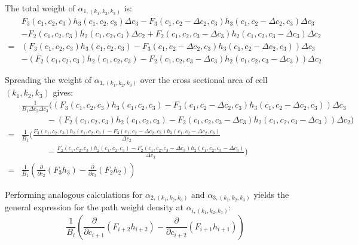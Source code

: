 \documentclass{book}
\begin{document}
The total weight of \(\alpha_{1, (k_1, k_2, k_3)}\) is:
\begin{align*}
& F_3(c_1,c_2,c_3)h_3(c_1,c_2,c_3)\Delta c_3 
- F_3(c_1,c_2 - \Delta c_2,c_3)h_3(c_1,c_2 - \Delta c_2,c_3)\Delta c_3 \\
& - F_2(c_1,c_2,c_3)h_2(c_1,c_2,c_3)\Delta c_2
+ F_2(c_1,c_2,c_3 - \Delta c_3)h_2(c_1,c_2,c_3 - \Delta c_3)\Delta c_2 \\ 
= & (F_3(c_1,c_2,c_3)h_3(c_1,c_2,c_3) 
- F_3(c_1,c_2 - \Delta c_2,c_3)h_3(c_1,c_2 - \Delta c_2,c_3))\Delta c_3 \\
& - (F_2(c_1,c_2,c_3)h_2(c_1,c_2,c_3)
- F_2(c_1,c_2,c_3 - \Delta c_3)h_2(c_1,c_2,c_3 - \Delta c_3))\Delta c_2
\end{align*}

Spreading the weight of \(\alpha_{1, (k_1, k_2, k_3)}\) over the cross sectional area of cell \((k_1, k_2, k_3)\) gives:
\begin{align*}
& \frac{1}{B_1 \Delta c_2 \Delta c_3}\bigg((F_3(c_1,c_2,c_3)h_3(c_1,c_2,c_3) 
- F_3(c_1,c_2 - \Delta c_2,c_3)h_3(c_1,c_2 - \Delta c_2,c_3))\Delta c_3 \\ 
& \quad\quad\quad - (F_2(c_1,c_2,c_3)h_2(c_1,c_2,c_3)
- F_2(c_1,c_2,c_3 - \Delta c_3)h_2(c_1,c_2,c_3 - \Delta c_3))\Delta c_2\bigg) \\
= & \frac{1}{B_1}\bigg(\frac{F_3(c_1,c_2,c_3)h_3(c_1,c_2,c_3) - F_3(c_1,c_2 - \Delta c_2,c_3)h_3(c_1,c_2 - \Delta c_2,c_3)}{\Delta c_2} \\ 
& \quad\quad\quad - \frac{F_2(c_1,c_2,c_3)h_2(c_1,c_2,c_3)
- F_2(c_1,c_2,c_3 - \Delta c_3)h_2(c_1,c_2,c_3 - \Delta c_3)}{\Delta c_3}\bigg) \\
= & \frac{1}{B_1}\left(\frac{\partial}{\partial c_2}(F_3 h_3) - \frac{\partial}{\partial c_3}(F_2 h_2)\right)
\end{align*}

Performing analogous calculations for \(\alpha_{2, (k_1, k_2, k_3)}\) and \(\alpha_{3, (k_1, k_2, k_3)}\) yields the general expression for the path weight density at \(\alpha_{i, (k_1, k_2, k_3)}\):
\[\frac{1}{B_i}\left(\frac{\partial}{\partial c_{i+1}}(F_{i+2} h_{i+2}) - \frac{\partial}{\partial c_{i+2}}(F_{i+1} h_{i+1})\right)\]
\end{document}
